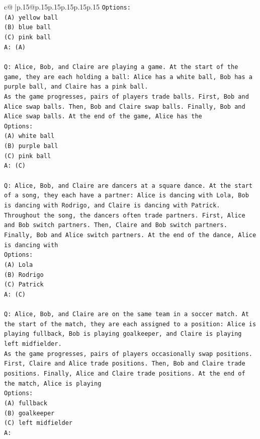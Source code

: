 \documentclass{article}
\begin{document}
{\begin{supertabular}{c@{$\;$}|p{.15\linewidth}@{}p{.15\linewidth}p{.15\linewidth}p{.15\linewidth}p{.15\linewidth}p{.15\linewidth}}
{{{\texttt{Options:} \\
\texttt{(A) yellow ball} \\
\texttt{(B) blue ball} \\
\texttt{(C) pink ball} \\
\texttt{A: (A)} \\
\\ 
\texttt{Q: Alice, Bob, and Claire are playing a game. At the start of the game, they are each holding a ball: Alice has a white ball, Bob has a purple ball, and Claire has a pink ball.} \\
\texttt{As the game progresses, pairs of players trade balls. First, Bob and Alice swap balls. Then, Bob and Claire swap balls. Finally, Bob and Alice swap balls. At the end of the game, Alice has the} \\
\texttt{Options:} \\
\texttt{(A) white ball} \\
\texttt{(B) purple ball} \\
\texttt{(C) pink ball} \\
\texttt{A: (C)} \\
\\ 
\texttt{Q: Alice, Bob, and Claire are dancers at a square dance. At the start of a song, they each have a partner: Alice is dancing with Lola, Bob is dancing with Rodrigo, and Claire is dancing with Patrick.} \\
\texttt{Throughout the song, the dancers often trade partners. First, Alice and Bob switch partners. Then, Claire and Bob switch partners. Finally, Bob and Alice switch partners. At the end of the dance, Alice is dancing with} \\
\texttt{Options:} \\
\texttt{(A) Lola} \\
\texttt{(B) Rodrigo} \\
\texttt{(C) Patrick} \\
\texttt{A: (C)} \\
\\ 
\texttt{Q: Alice, Bob, and Claire are on the same team in a soccer match. At the start of the match, they are each assigned to a position: Alice is playing fullback, Bob is playing goalkeeper, and Claire is playing left midfielder.} \\
\texttt{As the game progresses, pairs of players occasionally swap positions. First, Claire and Alice trade positions. Then, Bob and Claire trade positions. Finally, Alice and Claire trade positions. At the end of the match, Alice is playing} \\
\texttt{Options:} \\
\texttt{(A) fullback} \\
\texttt{(B) goalkeeper} \\
\texttt{(C) left midfielder} \\
\texttt{A:} \\
            }
        }
    }
     \\ \\


\end{supertabular}}
\end{document}
